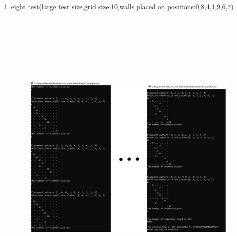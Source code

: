 \documentclass{article}
\begin{document}
\begin{enumerate}
\newpage
\item eight test(large test size,grid size:10,walls placed on positions:0,8,4,1,9,6,7)
\begin{figure}[h]
\includegraphics[width=12 cm, height=15cm]{test8}
\end{figure}


\end{enumerate}
\end{document}
